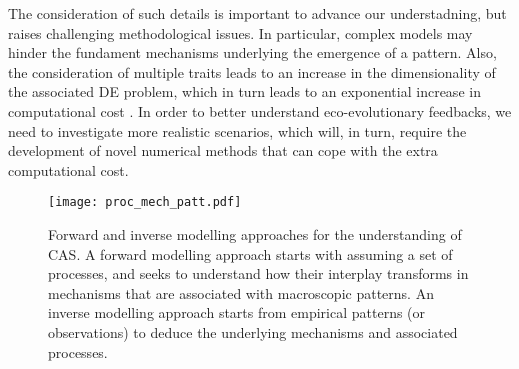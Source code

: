 % 
% 
The consideration of such details is important to advance our understadning, but raises challenging methodological issues. 
% 
In particular, complex models may hinder the fundament mechanisms underlying the emergence of a pattern.
% 
Also, the consideration of multiple traits leads to an increase in the dimensionality of the associated DE problem, which in turn leads to an exponential increase in computational cost \cite{XXX}.
% 
In order to better understand eco-evolutionary feedbacks, we need to investigate more realistic scenarios, which will, in turn, require the development of novel numerical methods that can cope with the extra computational cost.
% 

\begin{figure}[t]
    \centering
    \texttt{[image: proc\_mech\_patt.pdf]}
    \caption{Forward and inverse modelling approaches for the understanding of CAS. A forward modelling approach starts with assuming a set of processes, and seeks to understand how their interplay transforms in mechanisms that are associated with macroscopic patterns. An inverse modelling approach starts from empirical patterns (or observations) to deduce the underlying mechanisms and associated processes.}
\end{figure}

